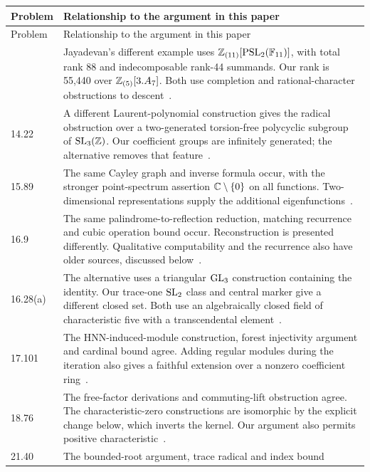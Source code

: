\small
\begin{longtable}{@{}p{}>{\raggedright\arraybackslash}p{}@{}}
\toprule
Problem & Relationship to the argument in this paper\\\midrule
\endfirsthead
\toprule Problem & Relationship to the argument in this paper\\\midrule
\endhead
\bottomrule\endfoot
4.55 & Jayadevan's different example uses \(\mathbb Z_{(11)}[\operatorname{PSL}_2(\mathbb F_{11})]\),
with total rank 88 and indecomposable rank-44 summands. Our rank is
55,440 over \(\mathbb Z_{(5)}[3.A_7]\). Both use completion and rational-character
obstructions to descent~\cite{jayadevan-4-55}.\\[5pt]
14.22 & A different Laurent-polynomial construction gives the radical
obstruction over a two-generated torsion-free polycyclic subgroup of
\(\operatorname{SL}_3(\mathbb Z)\). Our coefficient groups are infinitely generated;
the alternative removes that feature~\cite{jayadevan-14-22}.\\[5pt]
15.89 & The same Cayley graph and inverse formula occur, with the stronger
point-spectrum assertion \(\mathbb C\setminus\{0\}\) on all functions.
Two-dimensional representations supply the additional eigenfunctions~\cite{jayadevan-15-89}.\\[5pt]
16.9 & The same palindrome-to-reflection reduction, matching recurrence
and cubic operation bound occur. Reconstruction is presented differently.
Qualitative computability and the recurrence also have older sources,
discussed below~\cite{jayadevan-16-9}.\\[5pt]
16.28(a) & The alternative uses a triangular \(\operatorname{GL}_3\) construction
containing the identity. Our trace-one \(\operatorname{SL}_2\) class and central
marker give a different closed set. Both use an algebraically closed
field of characteristic five with a transcendental element~\cite{jayadevan-16-28}.\\[5pt]
17.101 & The HNN-induced-module construction, forest injectivity argument
and cardinal bound agree. Adding regular modules during the iteration
also gives a faithful extension over a nonzero coefficient ring~\cite{jayadevan-17-101}.\\[5pt]
18.76 & The free-factor derivations and commuting-lift obstruction agree.
The characteristic-zero constructions are isomorphic by the explicit
change below, which inverts the kernel. Our argument also permits
positive characteristic~\cite{jayadevan-18-76}.\\[5pt]
21.40 & The bounded-root argument, trace radical and index bound

\end{longtable}
